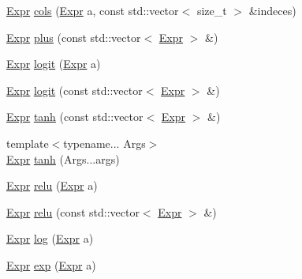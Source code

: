 \begin{DoxyCompactItemize}
\item 
\hyperlink{namespacemarian_a498d8baf75b754011078b890b39c8e12}{Expr} \hyperlink{namespacemarian_ab9fbdcc76cc853270094524572584222}{cols} (\hyperlink{namespacemarian_a498d8baf75b754011078b890b39c8e12}{Expr} a, const std\+::vector$<$ size\+\_\+t $>$ \&indeces)
\item 
\hyperlink{namespacemarian_a498d8baf75b754011078b890b39c8e12}{Expr} \hyperlink{namespacemarian_a857d82a0343a47a1d864deac823a5f3e}{plus} (const std\+::vector$<$ \hyperlink{namespacemarian_a498d8baf75b754011078b890b39c8e12}{Expr} $>$ \&)
\item 
\hyperlink{namespacemarian_a498d8baf75b754011078b890b39c8e12}{Expr} \hyperlink{namespacemarian_a72a6c5cedeadde602b3621a3450dbebe}{logit} (\hyperlink{namespacemarian_a498d8baf75b754011078b890b39c8e12}{Expr} a)
\item 
\hyperlink{namespacemarian_a498d8baf75b754011078b890b39c8e12}{Expr} \hyperlink{namespacemarian_a1d8d60c90679163c7e9306dd963d981c}{logit} (const std\+::vector$<$ \hyperlink{namespacemarian_a498d8baf75b754011078b890b39c8e12}{Expr} $>$ \&)
\item 
\hyperlink{namespacemarian_a498d8baf75b754011078b890b39c8e12}{Expr} \hyperlink{namespacemarian_ab84fcdb2b1fa95f89e3921aea4027957}{tanh} (const std\+::vector$<$ \hyperlink{namespacemarian_a498d8baf75b754011078b890b39c8e12}{Expr} $>$ \&)
\item 
{\footnotesize template$<$typename... Args$>$ }\\\hyperlink{namespacemarian_a498d8baf75b754011078b890b39c8e12}{Expr} \hyperlink{namespacemarian_ae5810f27b42d7d5f9b83ae23ddf544f2}{tanh} (Args...\+args)
\item 
\hyperlink{namespacemarian_a498d8baf75b754011078b890b39c8e12}{Expr} \hyperlink{namespacemarian_a6228f7e46aeed337e3886df6446b7840}{relu} (\hyperlink{namespacemarian_a498d8baf75b754011078b890b39c8e12}{Expr} a)
\item 
\hyperlink{namespacemarian_a498d8baf75b754011078b890b39c8e12}{Expr} \hyperlink{namespacemarian_ac6862e08641f7b69fac5012cf377e0d1}{relu} (const std\+::vector$<$ \hyperlink{namespacemarian_a498d8baf75b754011078b890b39c8e12}{Expr} $>$ \&)
\item 
\hyperlink{namespacemarian_a498d8baf75b754011078b890b39c8e12}{Expr} \hyperlink{namespacemarian_a0f3132fbaaaf9a5f2c1cbf6e3ad8f5f5}{log} (\hyperlink{namespacemarian_a498d8baf75b754011078b890b39c8e12}{Expr} a)
\item 
\hyperlink{namespacemarian_a498d8baf75b754011078b890b39c8e12}{Expr} \hyperlink{namespacemarian_a4d47fe908c56b6de5c71209339461321}{exp} (\hyperlink{namespacemarian_a498d8baf75b754011078b890b39c8e12}{Expr} a)

\end{DoxyCompactItemize}
